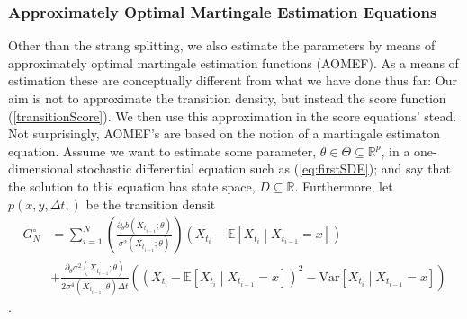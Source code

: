 \subsubsection{Approximately Optimal Martingale Estimation Equations}\label{subsubsec:approximatelyOptimalMartingaleEstimationEquation}
Other than the strang splitting, we also estimate the parameters by means of approximately optimal martingale estimation functions (AOMEF). As a means of estimation these are conceptually different from what we have done thus far: Our aim is not to approximate the transition density, but instead the score function (\ref{transitionScore}). We then use this approximation in the score equations' stead.\\ Not surprisingly, AOMEF's are based on the notion of a martingale estimaton equation. Assume we want to estimate some parameter, $\theta\in \Theta \subseteq \mathbb{R}^p$, in a one-dimensional stochastic differential equation such as (\ref{eq:firstSDE}); and say that the solution to this equation has state space, $D\subseteq \mathbb{R}$. Furthermore, let $p(x, y, \Delta t, )$ be the transition densit
\begin{align}
    G_N^{\circ} &= \sum_{i = 1}^N 
    \left(
        \frac{\partial_\theta b\left(X_{t_{i-1}};\theta\right)}{\sigma^2\left(X_{t_{i-1}};\theta\right)}
    \right) \left(X_{t_{i}} - \mathbb{E}\left[X_{t_{i}} \middle| X_{t_{i-1}} = x\right]\right) \nonumber \\
    &+ \frac{\partial_\theta\sigma^2\left(X_{t_{i-1}}; \theta\right)}{2\sigma^4\left(X_{t_{i - 1}}; \theta\right)\Delta t}\left(\left(X_{t_{i}} - \mathbb{E}\left[X_{t_{i}} \middle| X_{t_{i-1}} = x\right]\right)^2 - \textrm{Var}\left[X_{t_{i}} \middle| X_{t_{i-1}} = x\right]\right) \label{eq:approximatelyOptimalMartingale}
\end{align}
\cite[Example 1.11]{StatisticalMethodsForSDE}.

